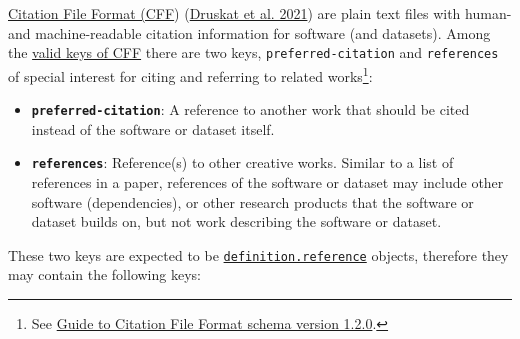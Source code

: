 \documentclass[
]{article}
\begin{document}
\href{https://citation-file-format.github.io/}{Citation File Format
(CFF}) (\protect\hyperlink{ref-druskat_citation_2021}{Druskat et al.
2021}) are plain text files with human- and machine-readable citation
information for software (and datasets). Among the
\href{https://github.com/citation-file-format/citation-file-format/blob/main/schema-guide.md\#valid-keys}{valid
keys of CFF} there are two keys, \texttt{preferred-citation} and
\texttt{references} of special interest for citing and referring to
related works\footnote{See
  \href{https://github.com/citation-file-format/citation-file-format/blob/main/schema-guide.md\#preferred-citation}{Guide
  to Citation File Format schema version 1.2.0}.}:

\begin{itemize}
\item
  \textbf{\texttt{preferred-citation}}: A reference to another work that
  should be cited instead of the software or dataset itself.
\item
  \textbf{\texttt{references}}: Reference(s) to other creative works.
  Similar to a list of references in a paper, references of the software
  or dataset may include other software (dependencies), or other
  research products that the software or dataset builds on, but not work
  describing the software or dataset.
\end{itemize}

These two keys are expected to be
\href{https://github.com/citation-file-format/citation-file-format/blob/main/schema-guide.md\#definitionsreference}{\texttt{definition.reference}}
objects, therefore they may contain the following keys:
\end{document}
